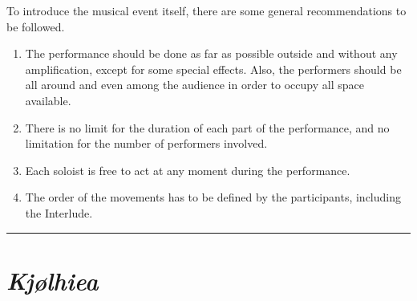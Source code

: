 \begin{description}
To introduce the musical event itself, there are some general recommendations to be followed.
\begin{enumerate}
\item The performance should be done as far as possible outside and without any amplification, except for some special effects. Also, the performers should be all around and even among the audience in order to occupy all space available.
\item There is no limit for the duration of each part of the performance, and no limitation for the number of performers involved.
\item Each soloist is free to act at any moment during the performance.
\item The order of the movements has to be defined by the participants, including the Interlude.
 \end{enumerate}
\end{description}

\bigskip
\begin{center}\rule{0.5\linewidth}{0.5pt}\end{center}
\bigskip

\section*{\textsl{Kj{\o}lhiea}}


\bigskip

